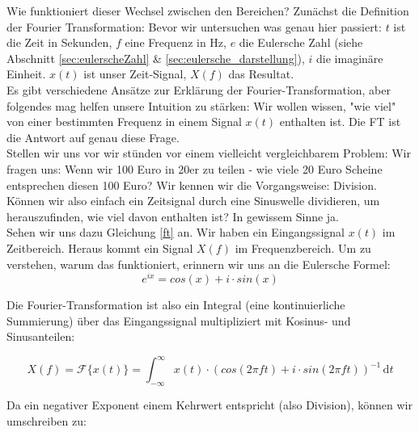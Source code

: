 Wie funktioniert dieser Wechsel zwischen den Bereichen? Zunächst die Definition der Fourier Transformation:
Bevor wir untersuchen was genau hier passiert: $t$ ist die Zeit in Sekunden, $f$ eine Frequenz in Hz, $e$ die Eulersche Zahl (siehe Abschnitt \ref{sec:eulerscheZahl} \& \ref{sec:eulersche_darstellung}), $i$ die imaginäre Einheit. $x(t)$ ist unser Zeit-Signal, $X(f)$ das Resultat.\\ 

Es gibt verschiedene Ansätze zur Erklärung der Fourier-Transformation, aber folgendes mag helfen unsere Intuition zu stärken: Wir wollen wissen, "wie viel" von einer bestimmten Frequenz in einem Signal $x(t)$ enthalten ist. Die FT ist die Antwort auf genau diese Frage. \\

Stellen wir uns vor wir stünden vor einem vielleicht vergleichbarem Problem: Wir fragen uns: Wenn wir 100 Euro in 20er zu teilen - wie viele 20 Euro Scheine entsprechen diesen 100 Euro? Wir kennen wir die Vorgangsweise: Division. \\
Können wir also einfach ein Zeitsignal durch eine Sinuswelle dividieren, um herauszufinden, wie viel davon enthalten ist? In gewissem Sinne ja. \\

Sehen wir uns dazu Gleichung \ref{ft} an. Wir haben ein Eingangssignal $x(t)$ im Zeitbereich. Heraus kommt ein Signal $X(f)$ im Frequenzbereich. Um zu verstehen, warum das funktioniert, erinnern wir uns an die Eulersche Formel:
\begin{equation}
	e ^{ix} = cos(x)+i \cdot sin(x)
\end{equation}

Die Fourier-Transformation ist also ein Integral (eine kontinuierliche Summierung) über das Eingangssignal multipliziert mit Kosinus- und Sinusanteilen:

\begin{equation}
	X(f)= \mathcal{F} \{x(t)\} = \int_{-\infty}^\infty \! x(t) \cdot (cos(2\pi ft)+i \cdot sin(2\pi ft) )^{-1}  \, \mathrm{d}t
	\label{ft2}
\end{equation}

Da ein negativer Exponent einem Kehrwert entspricht (also Division), können wir umschreiben zu:

